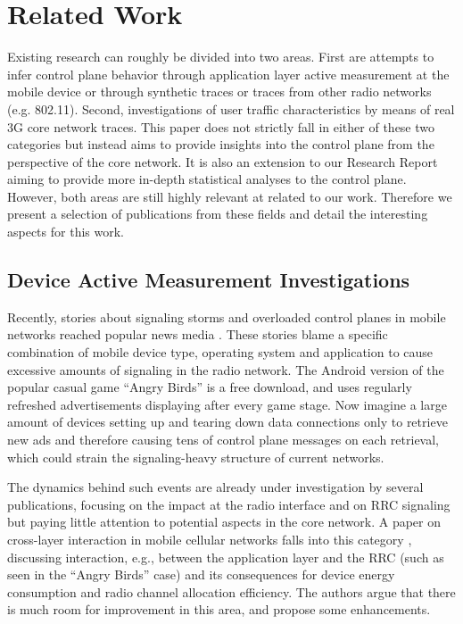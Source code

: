 
\section{Related Work}
Existing research can roughly be divided into two areas. First are attempts to infer control plane behavior through application layer active measurement at the mobile device or through synthetic traces or traces from other radio networks (e.g. 802.11).
Second, investigations of user traffic characteristics by means of real 3G core network traces.
This paper does not strictly fall in either of these two categories but instead aims to provide insights into the control plane from the perspective of the core network. It is also an extension to our Research Report\cite{metzger2012research} aiming to provide more in-depth statistical analyses to the control plane.  
However, both areas are still highly relevant at related to our work. Therefore we present a selection of publications from these fields and detail the interesting aspects for this work.



\subsection{Device Active Measurement Investigations}

Recently, stories about signaling storms and overloaded control planes in mobile networks reached popular news media \cite{it2011birdandroid, lt2012docostorm}. These stories blame a specific combination of mobile device type, operating system and application to cause excessive amounts of signaling in the radio network. The Android version of the popular casual game ``Angry Birds'' is a free download, and uses regularly refreshed advertisements displaying after every game stage. Now imagine a large amount of devices setting up and tearing down data connections only to retrieve new ads and therefore causing tens of control plane messages on each retrieval, which could strain the signaling-heavy structure of current networks. 

The dynamics behind such events are already under investigation by several publications, focusing on the impact at the radio interface and on \gls{RRC} signaling but paying little attention to potential aspects in the core network. A paper on cross-layer interaction in mobile cellular networks falls into this category \cite{qian2011profiling}, discussing interaction, e.g., between the application layer and the \gls{RRC} (such as seen in the ``Angry Birds'' case) and its consequences for device energy consumption and radio channel allocation efficiency. The authors argue that there is much room for improvement in this area, and propose some enhancements.


